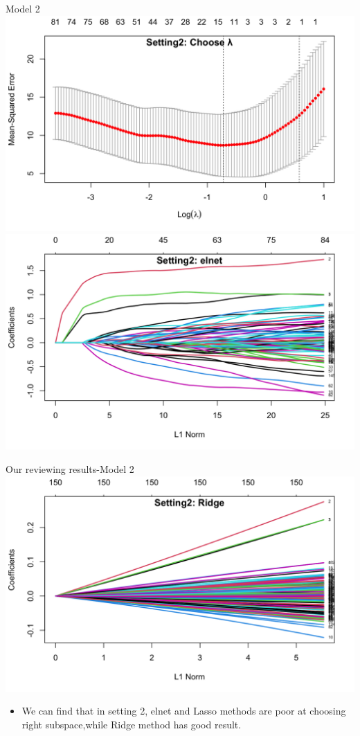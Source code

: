 \documentclass{beamer}
\begin{document}
\begin{frame}{Model 2}
    \centering \includegraphics[scale=0.13]{2.3.png}
     \includegraphics[scale=0.13]{2.4.png}
\end{frame}
\begin{frame}{Our reviewing results-Model 2}
    \centering \includegraphics[scale=0.15]{2.2.png}
    \begin{itemize}
        \item We can find that in setting 2, elnet and Lasso methods are poor at choosing right subspace,while Ridge method has good result.
    \end{itemize}
\end{frame}
\end{document}

